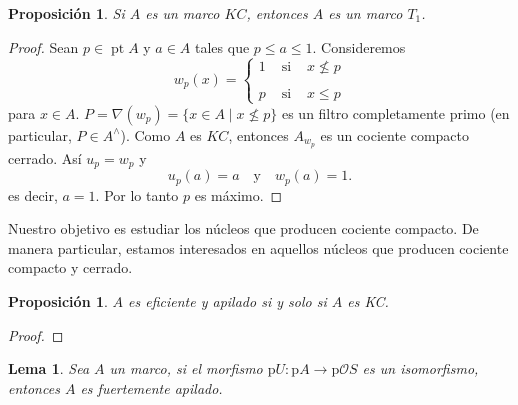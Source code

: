 \documentclass[11pt]{amsart}
\DeclareMathOperator{\pt}{pt}
\theoremstyle{plain}
\newtheorem{lem}[thm]{Lema}
\newtheorem{prop}[thm]{Proposición}
\theoremstyle{definition}
\begin{document}
\begin{prop}\label{KCT1}
Si $A$ es un marco $KC$, entonces $A$ es un marco $T_1$.
\end{prop}

\begin{proof}
Sean $p\in \pt A$ y $a\in A$ tales que $p\leq a\leq 1$. Consideremos 
\[
w_p(x)=\left\{\begin{array}{lcc}
1 & \mbox{ si } & x\nleq p\\
\\
p & \mbox{ si } & x\leq p
\end{array}\right.
\]
para $x\in A$. $P=\nabla(w_p)=\{x\in A\mid x\nleq p\}$ es un filtro completamente primo (en particular, $P\in A^\wedge$). Como $A$ es $KC$, entonces $A_{w_p}$ es un cociente compacto cerrado. Así $u_p=w_p$ y
\[
u_p(a)=a\quad \mbox{y}\quad w_p(a)=1.
\]
es decir, $a=1$. Por lo tanto $p$ es máximo. 
\end{proof}

Nuestro objetivo es estudiar los núcleos que producen cociente compacto. De manera particular, estamos interesados en 
aquellos núcleos que producen cociente compacto y cerrado.\\
\begin{prop}
$A$ es eficiente y apilado si y solo si $A$ es KC.
\end{prop}

\begin{proof}

\end{proof}


\begin{lem}\label{patchiso}
Sea $A$ un marco, si el morfismo $\mathrm{p}U\colon\mathrm{p}A\rightarrow\mathrm{p}\mathcal{O}S$ 
es un isomorfismo, entonces $A$ es fuertemente apilado.

\end{lem}
\end{document}
